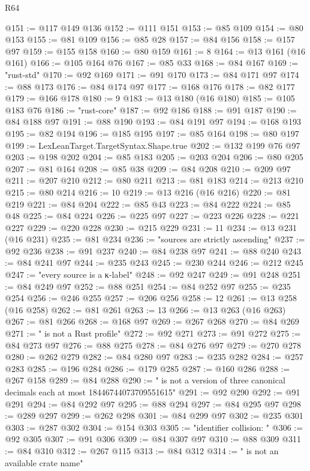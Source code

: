 \begin{lexlean}{R64}
\begin{coremodule}
@151 := @117 @149 @136
@152 := @111 @151
@153 := @85 @109
@154 := @80 @153
@155 := @81 @109
@156 := @85 @28
@157 := @84 @156
@158 := @157 @97
@159 := @155 @158
@160 := @80 @159
@161 := 8
@164 := @13 @161 (@16 @161)
@166 := @105 @164 @76
@167 := @85 @33
@168 := @84 @167
@169 := "rust-std"
@170 := @92 @169
@171 := @91 @170
@173 := @84 @171 @97
@174 := @88 @173
@176 := @84 @174 @97
@177 := @168 @176
@178 := @82 @177
@179 := @166 @178
@180 := 9
@183 := @13 @180 (@16 @180)
@185 := @105 @183 @76
@186 := "rust-core"
@187 := @92 @186
@188 := @91 @187
@190 := @84 @188 @97
@191 := @88 @190
@193 := @84 @191 @97
@194 := @168 @193
@195 := @82 @194
@196 := @185 @195
@197 := @85 @164
@198 := @80 @197
@199 := LexLeanTarget.TargetSyntax.Shape.true
@202 := @132 @199 @76 @97
@203 := @198 @202
@204 := @85 @183
@205 := @203 @204
@206 := @80 @205
@207 := @81 @164
@208 := @85 @38
@209 := @84 @208
@210 := @209 @97
@211 := @207 @210
@212 := @80 @211
@213 := @81 @183
@214 := @213 @210
@215 := @80 @214
@216 := 10
@219 := @13 @216 (@16 @216)
@220 := @81 @219
@221 := @84 @204
@222 := @85 @43
@223 := @84 @222
@224 := @85 @48
@225 := @84 @224
@226 := @225 @97
@227 := @223 @226
@228 := @221 @227
@229 := @220 @228
@230 := @215 @229
@231 := 11
@234 := @13 @231 (@16 @231)
@235 := @81 @234
@236 := "sources are strictly ascending"
@237 := @92 @236
@238 := @91 @237
@240 := @84 @238 @97
@241 := @88 @240
@243 := @84 @241 @97
@244 := @235 @243
@245 := @230 @244
@246 := @212 @245
@247 := "every source is a κ-label"
@248 := @92 @247
@249 := @91 @248
@251 := @84 @249 @97
@252 := @88 @251
@254 := @84 @252 @97
@255 := @235 @254
@256 := @246 @255
@257 := @206 @256
@258 := 12
@261 := @13 @258 (@16 @258)
@262 := @81 @261
@263 := 13
@266 := @13 @263 (@16 @263)
@267 := @81 @266
@268 := @168 @97
@269 := @267 @268
@270 := @84 @269
@271 := " is not a Rust profile"
@272 := @92 @271
@273 := @91 @272
@275 := @84 @273 @97
@276 := @88 @275
@278 := @84 @276 @97
@279 := @270 @278
@280 := @262 @279
@282 := @84 @280 @97
@283 := @235 @282
@284 := @257 @283
@285 := @196 @284
@286 := @179 @285
@287 := @160 @286
@288 := @267 @158
@289 := @84 @288
@290 := " is not a version of three canonical decimals each at most 18446744073709551615"
@291 := @92 @290
@292 := @91 @291
@294 := @84 @292 @97
@295 := @88 @294
@297 := @84 @295 @97
@298 := @289 @297
@299 := @262 @298
@301 := @84 @299 @97
@302 := @235 @301
@303 := @287 @302
@304 := @154 @303
@305 := "identifier collision: "
@306 := @92 @305
@307 := @91 @306
@309 := @84 @307 @97
@310 := @88 @309
@311 := @84 @310
@312 := @267 @115
@313 := @84 @312
@314 := " is not an available crate name"

\end{coremodule}
\end{lexlean}

